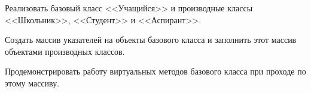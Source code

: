 Реализовать базовый класс <<Учащийся>> и производные
классы <<Школьник>>, <<Студент>> и <<Аспирант>>.

Создать
массив указателей на объекты базового класса и заполнить
этот массив объектами производных классов.

Продемонстрировать работу виртуальных методов базового
класса при проходе по этому массиву.
